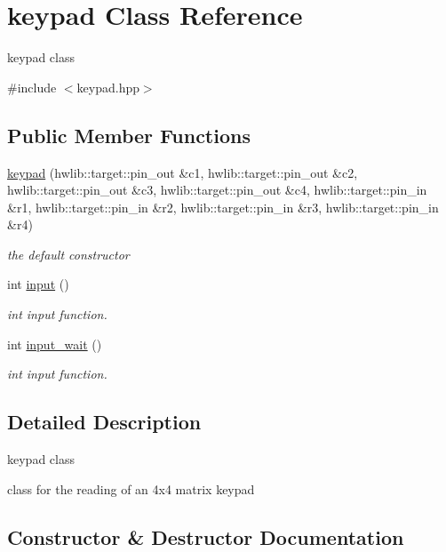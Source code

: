 \hypertarget{classkeypad}{}\section{keypad Class Reference}
\label{classkeypad}


keypad class  




{\ttfamily \#include $<$keypad.\+hpp$>$}

\subsection*{Public Member Functions}
\begin{DoxyCompactItemize}
\item 
\hyperlink{classkeypad_a6e342bf7c51143f25a84db9e0992039b}{keypad} (hwlib\+::target\+::pin\+\_\+out \&c1, hwlib\+::target\+::pin\+\_\+out \&c2, hwlib\+::target\+::pin\+\_\+out \&c3, hwlib\+::target\+::pin\+\_\+out \&c4, hwlib\+::target\+::pin\+\_\+in \&r1, hwlib\+::target\+::pin\+\_\+in \&r2, hwlib\+::target\+::pin\+\_\+in \&r3, hwlib\+::target\+::pin\+\_\+in \&r4)
\begin{DoxyCompactList}\small\item\em the default constructor \end{DoxyCompactList}\item 
int \hyperlink{classkeypad_a2a1334d93f32abfe59930a35b61bdbba}{input} ()
\begin{DoxyCompactList}\small\item\em int input function. \end{DoxyCompactList}\item 
int \hyperlink{classkeypad_a2ae7159fe81ba33ee01b62688ad6e860}{input\+\_\+wait} ()
\begin{DoxyCompactList}\small\item\em int input function. \end{DoxyCompactList}\end{DoxyCompactItemize}


\subsection{Detailed Description}
keypad class 

class for the reading of an 4x4 matrix keypad 

\subsection{Constructor \& Destructor Documentation}
